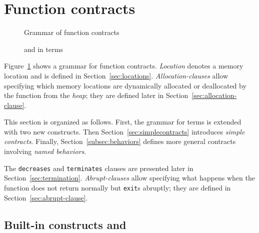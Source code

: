 \section{Function contracts}
\label{sec:fn-behavior}

\begin{figure}[t]
  \begin{cadre}
      
   \end{cadre}
    \caption{Grammar of function contracts}
  \label{fig:gram:contracts}
\end{figure}

\begin{figure}[t]
  \begin{cadre}
      
    \end{cadre}
    \caption{\protect\old and \protect\result in terms}
  \label{fig:gram:oldandresult}
\end{figure}

Figure~\ref{fig:gram:contracts} shows a grammar for function
contracts. \textsl{Location} denotes a memory location and is defined
in Section~\ref{sec:locations}. 
\textsl{Allocation-clauses} allow specifying which memory locations 
are dynamically allocated or deallocated by the function from the \textsl{heap}; 
they are defined later in Section~\ref{sec:allocation-clause}.

This section is organized as follows.  First, the grammar for terms is
extended with two new constructs.  Then
Section~\ref{sec:simplecontracts} introduces \emph{simple contracts}.
Finally, Section~\ref{subsec:behaviors} defines more general contracts
involving \emph{named behaviors}. 

The \lstinline|decreases| and
\lstinline|terminates| clauses are presented later in
Section~\ref{sec:termination}.
\textsl{Abrupt-clauses}
allow specifying what happens when the function does not return
normally but \lstinline|exit|s abruptly; they are defined in
Section~\ref{sec:abrupt-clause}.


\subsection{Built-in constructs %
  \texorpdfstring{\old}{\textbackslash{}old} %
 and \texorpdfstring{\result}{\textbackslash{}result}}

